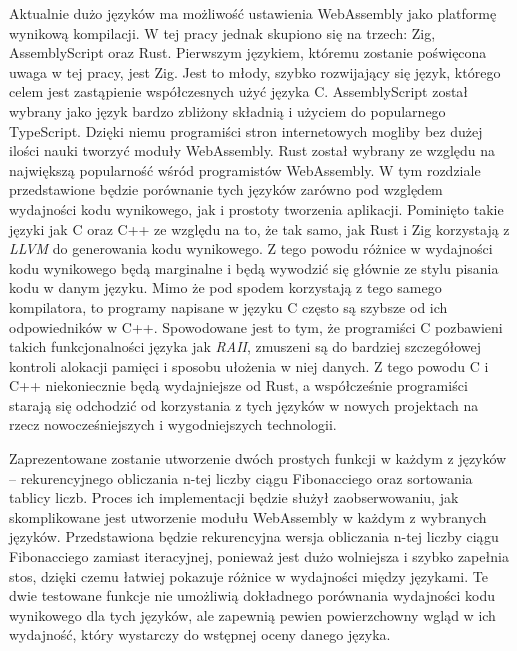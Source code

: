 \documentclass[language=polish,type=master]{aghmodern}
\begin{document}
Aktualnie dużo języków ma możliwość ustawienia WebAssembly jako platformę wynikową kompilacji.
W tej pracy jednak skupiono się na trzech: Zig, AssemblyScript oraz Rust.
Pierwszym językiem, któremu zostanie poświęcona uwaga w tej pracy, jest Zig.
Jest to młody, szybko rozwijający się język, którego celem jest zastąpienie współczesnych użyć języka C.
AssemblyScript został wybrany jako język bardzo zbliżony składnią i użyciem do popularnego TypeScript.
Dzięki niemu programiści stron internetowych mogliby bez dużej ilości nauki tworzyć moduły WebAssembly.
Rust został wybrany ze względu na największą popularność wśród programistów WebAssembly.
W tym rozdziale przedstawione będzie porównanie tych języków zarówno pod względem wydajności kodu wynikowego, jak i prostoty tworzenia aplikacji.
Pominięto takie języki jak C oraz C++ ze względu na to, że tak samo, jak Rust i Zig korzystają z \emph{LLVM}\footnotemark{} do generowania kodu wynikowego.
Z tego powodu różnice w wydajności kodu wynikowego będą marginalne i będą wywodzić się głównie ze stylu pisania kodu w danym języku.
Mimo że pod spodem korzystają z tego samego kompilatora, to programy napisane w języku C często są szybsze od ich odpowiedników w C++.
Spowodowane jest to tym, że programiści C pozbawieni takich funkcjonalności języka jak \emph{RAII}\footnotemark{}, zmuszeni są do bardziej szczegółowej kontroli alokacji pamięci i sposobu ułożenia w niej danych.
Z tego powodu C i C++ niekoniecznie będą wydajniejsze od Rust, a współcześnie programiści starają się odchodzić od korzystania z tych języków w nowych projektach na rzecz nowocześniejszych i wygodniejszych technologii.

Zaprezentowane zostanie utworzenie dwóch prostych funkcji w każdym z języków -- rekurencyjnego obliczania n-tej liczby ciągu Fibonacciego oraz sortowania tablicy liczb.
Proces ich implementacji będzie służył zaobserwowaniu, jak skomplikowane jest utworzenie modułu WebAssembly w każdym z wybranych języków.
Przedstawiona będzie rekurencyjna wersja obliczania n-tej liczby ciągu Fibonacciego zamiast iteracyjnej, ponieważ jest dużo wolniejsza i szybko zapełnia stos, dzięki czemu łatwiej pokazuje różnice w wydajności między językami.
Te dwie testowane funkcje nie umożliwią dokładnego porównania wydajności kodu wynikowego dla tych języków, ale zapewnią pewien powierzchowny wgląd w ich wydajność, który wystarczy do wstępnej oceny danego języka.
\end{document}
